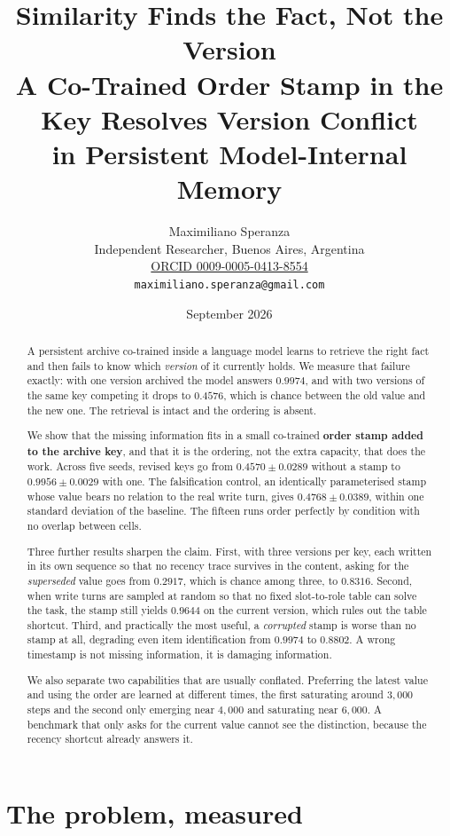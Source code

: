 \documentclass[11pt,a4paper]{article}
\title{\bfseries Similarity Finds the Fact, Not the Version\\
\large A Co-Trained Order Stamp in the Key Resolves Version Conflict\\
in Persistent Model-Internal Memory}
\author{Maximiliano Speranza\\
\small Independent Researcher, Buenos Aires, Argentina\\
\small \href{https://orcid.org/0009-0005-0413-8554}{ORCID 0009-0005-0413-8554}\\
\small \texttt{maximiliano.speranza@gmail.com}}
\date{September 2026}
\begin{document}
\maketitle

\begin{abstract}
\noindent
A persistent archive co-trained inside a language model learns to retrieve the right fact and then
fails to know which \emph{version} of it currently holds. We measure that failure exactly: with one
version archived the model answers $0.9974$, and with two versions of the same key competing it drops
to $0.4576$, which is chance between the old value and the new one. The retrieval is intact and the
ordering is absent.

We show that the missing information fits in a small co-trained \textbf{order stamp added to the
archive key}, and that it is the ordering, not the extra capacity, that does the work. Across five
seeds, revised keys go from $0.4570 \pm 0.0289$ without a stamp to $\mathbf{0.9956 \pm 0.0029}$ with
one. The falsification control, an identically parameterised stamp whose value bears no relation to
the real write turn, gives $0.4768 \pm 0.0389$, within one standard deviation of the baseline. The
fifteen runs order perfectly by condition with no overlap between cells.

Three further results sharpen the claim. First, with three versions per key, each written in its own
sequence so that no recency trace survives in the content, asking for the \emph{superseded} value goes
from $0.2917$, which is chance among three, to $0.8316$. Second, when write turns are sampled at random
so that no fixed slot-to-role table can solve the task, the stamp still yields $0.9644$ on the current
version, which rules out the table shortcut. Third, and practically the most useful, a \emph{corrupted}
stamp is worse than no stamp at all, degrading even item identification from $0.9974$ to $0.8802$. A
wrong timestamp is not missing information, it is damaging information.

We also separate two capabilities that are usually conflated. Preferring the latest value and using
the order are learned at different times, the first saturating around $3{,}000$ steps and the second
only emerging near $4{,}000$ and saturating near $6{,}000$. A benchmark that only asks for the current
value cannot see the distinction, because the recency shortcut already answers it.
\end{abstract}

\section{The problem, measured}
\end{document}
